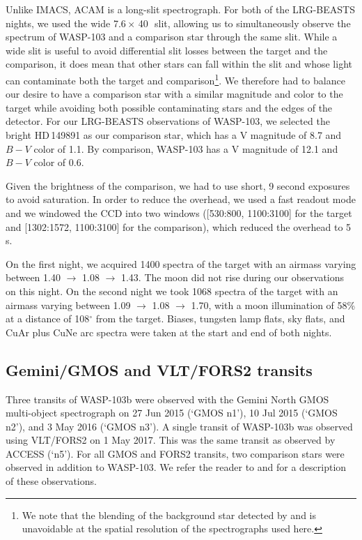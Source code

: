 \documentclass[twocolumn]{aastex63}
\begin{document}
Unlike IMACS, ACAM is a long-slit spectrograph. For both of the LRG-BEASTS nights, we used the wide 7.6\,\arcmin $\times$ 40\,\arcsec\ slit, allowing us to simultaneously observe the spectrum of WASP-103 and a comparison star through the same slit. While a wide slit is useful to avoid differential slit losses between the target and the comparison, it does mean that other stars can fall within the slit and whose light can contaminate both the target and comparison\footnote{We note that the blending of the background star detected by \cite{Wollert2015} and \cite{Ngo2016} is unavoidable at the spatial resolution of the spectrographs used here.}. We therefore had to balance our desire to have a comparison star with a similar magnitude and color to the target while avoiding both possible contaminating stars and the edges of the detector. For our LRG-BEASTS observations of WASP-103, we selected the bright HD\,149891 as our comparison star, which has a V magnitude of 8.7 and $B-V$ color of 1.1. By comparison, WASP-103 has a V magnitude of 12.1 and $B-V$ color of 0.6. 

Given the brightness of the comparison, we had to use short, 9 second exposures to avoid saturation. In order to reduce the overhead, we used a fast readout mode and we windowed the CCD into two windows ([530:800, 1100:3100] for the target and [1302:1572, 1100:3100] for the comparison), which reduced the overhead to 5\,s.

On the first night, we acquired 1400 spectra of the target with an airmass varying between 1.40 $\rightarrow$ 1.08 $\rightarrow$ 1.43. The moon did not rise during our observations on this night. On the second night we took 1068 spectra of the target with an airmass varying between 1.09 $\rightarrow$ 1.08 $\rightarrow$ 1.70, with a moon illumination of 58\% at a distance of 108$^\circ$ from the target. Biases, tungsten lamp flats, sky flats, and CuAr plus CuNe arc spectra were taken at the start and end of both nights.

\subsection{Gemini/GMOS and VLT/FORS2 transits}
\label{sec:obs_GMOS}

Three transits of WASP-103b were observed with the Gemini North GMOS multi-object spectrograph on 27 Jun 2015 (`GMOS n1'), 10 Jul 2015 (`GMOS n2'), and 3 May 2016 (`GMOS n3'). A single transit of WASP-103b was observed using VLT/FORS2 on 1 May 2017. This was the same transit as observed by ACCESS (`n5'). For all GMOS and FORS2 transits, two comparison stars were observed in addition to WASP-103. We refer the reader to \cite{Lendl2017} and \cite{Wilson2020} for a description of these observations. 
\end{document}
